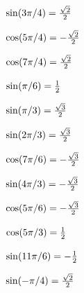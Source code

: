 \documentclass{article}
\begin{document}
\begin{enumerate}
\begin{tasks}[after-item-skip=64pt]
    \task 
      \begin{problem}
        $\sin (3\pi/4)=\frac{\sqrt{2}}{2}$
      \end{problem}

    \task 
      \begin{problem}
        $\cos (5\pi/4)=-\frac{\sqrt{2}}{2}$
      \end{problem}

    \task 
      \begin{problem}
        $\cos (7\pi/4)=\frac{\sqrt{2}}{2}$
      \end{problem}

    \task 
      \begin{problem}
        $\sin (\pi/6)=\frac{1}{2}$
      \end{problem}

    \task 
      \begin{problem}
        $\sin (\pi/3)=\frac{\sqrt{3}}{2}$
      \end{problem}

    \task 
      \begin{problem}
        $\sin(2\pi/3)=\frac{\sqrt{3}}{2}$
      \end{problem}

    \task 
      \begin{problem}
        $\cos(7\pi/6)=-\frac{\sqrt{3}}{2}$
      \end{problem}

    \task 
      \begin{problem}
        $\sin (4\pi/3)=-\frac{\sqrt{3}}{2}$
      \end{problem}

    \task 
      \begin{problem}
        $\cos(5\pi/6)=-\frac{\sqrt{3}}{2}$
      \end{problem}

    \task 
      \begin{problem}
        $\cos(5\pi/3)=\frac{1}{2}$
      \end{problem}

    \task 
      \begin{problem}
        $\sin(11\pi/6)=-\frac{1}{2}$
      \end{problem}

        \task 
      \begin{problem}
        $\sin (-\pi/4)=\frac{\sqrt{2}}{2}$
      \end{problem}


\end{tasks}
\end{enumerate}
\end{document}
